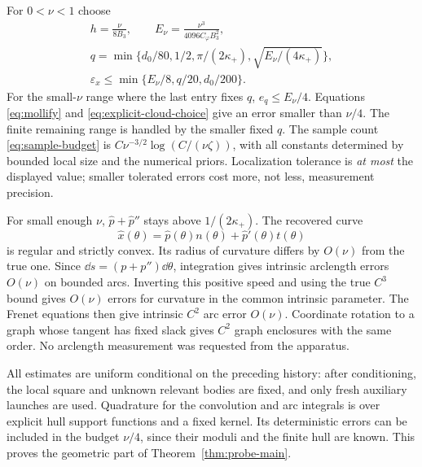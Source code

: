For $0<\nu<1$ choose
\begin{equation}\label{eq:explicit-cloud-choice}
 \begin{gathered}
 h=\frac{\nu}{8B_3},\qquad
 E_\nu=\frac{\nu^3}{4096C_\varphi B_3^2},\\
 q=\min\{d_0/80,1/2,\pi/(2\kappa_+),
                         \sqrt{E_\nu/(4\kappa_+)}\},\\
 \varepsilon_x\le\min\{E_\nu/8,q/20,d_0/200\}.
 \end{gathered}
\end{equation}
For the small-$\nu$ range where the last entry fixes $q$,
$e_q\le E_\nu/4$. Equations \eqref{eq:mollify} and
\eqref{eq:explicit-cloud-choice} give an error smaller than $\nu/4$.
The finite remaining range is handled by the smaller fixed $q$.
The sample count \eqref{eq:sample-budget} is
$C\nu^{-3/2}\log(C/(\nu\zeta))$, with all constants determined by
bounded local size and the numerical priors. Localization tolerance is
\emph{at most} the displayed value; smaller tolerated errors cost more,
not less, measurement precision.

For small enough $\nu$, $\widehat p+\widehat p''$ stays above
$1/(2\kappa_+)$. The recovered curve
\[
 \widehat x(\theta)=\widehat p(\theta)n(\theta)
                         +\widehat p'(\theta)t(\theta)
\]
is regular and strictly convex. Its radius of curvature differs by
$O(\nu)$ from the true one. Since
$\dd s=(p+p'')\dd\theta$, integration gives intrinsic arclength errors
$O(\nu)$ on bounded arcs. Inverting this positive speed and using the
true $C^3$ bound gives $O(\nu)$ errors for curvature in the common
intrinsic parameter. The Frenet equations then give intrinsic $C^2$
arc error $O(\nu)$. Coordinate rotation to a graph whose tangent has
fixed slack gives $C^2$ graph enclosures with the same order. No
arclength measurement was requested from the apparatus.

All estimates are uniform conditional on the preceding history: after
conditioning, the local square and unknown relevant bodies are fixed,
and only fresh auxiliary launches are used. Quadrature for the convolution
and arc integrals is over explicit hull support functions and a fixed
kernel. Its deterministic errors can be included in the budget
$\nu/4$, since their moduli and the finite hull are known. This proves
the geometric part of Theorem~\ref{thm:probe-main}.
